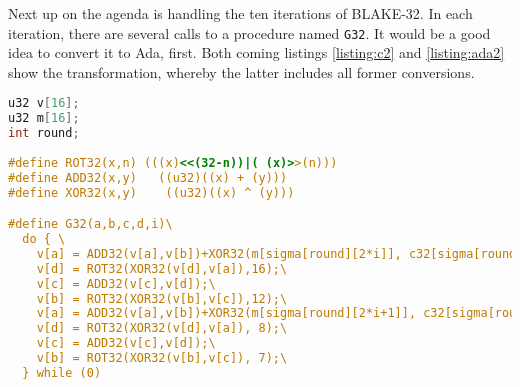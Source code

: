 \documentclass{acmtrans2m}
\begin{document}
\vfill

Next up on the agenda is handling the ten iterations of BLAKE-32. In each iteration,
there are several calls to a procedure named \texttt{G32}. It would be a good
idea to convert it to Ada, first. Both coming listings \ref{listing:c2} and \ref{listing:ada2}
show the transformation, whereby the latter includes all former conversions.

\begin{lstlisting}[language=C,caption={Declaration of G32 in C},label=listing:c2]
u32 v[16];
u32 m[16];
int round;
  
#define ROT32(x,n) (((x)<<(32-n))|( (x)>>(n)))
#define ADD32(x,y)   ((u32)((x) + (y)))
#define XOR32(x,y)    ((u32)((x) ^ (y)))

#define G32(a,b,c,d,i)\
  do { \
    v[a] = ADD32(v[a],v[b])+XOR32(m[sigma[round][2*i]], c32[sigma[round][2*i+1]]);\
    v[d] = ROT32(XOR32(v[d],v[a]),16);\
    v[c] = ADD32(v[c],v[d]);\
    v[b] = ROT32(XOR32(v[b],v[c]),12);\
    v[a] = ADD32(v[a],v[b])+XOR32(m[sigma[round][2*i+1]], c32[sigma[round][2*i]]);\
    v[d] = ROT32(XOR32(v[d],v[a]), 8);\
    v[c] = ADD32(v[c],v[d]);\
    v[b] = ROT32(XOR32(v[b],v[c]), 7);\
  } while (0)
\end{lstlisting}
\end{document}
